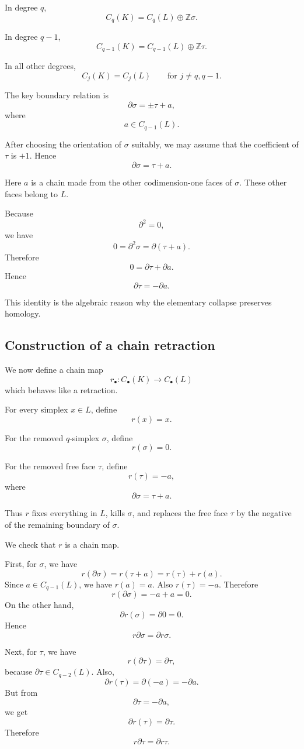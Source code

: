 \documentclass[12pt,a4paper]{article}
\theoremstyle{notespace}
\begin{document}
In degree \(q\),
\[
C_q(K)=C_q(L)\oplus \mathbb Z\sigma.
\]

In degree \(q-1\),
\[
C_{q-1}(K)=C_{q-1}(L)\oplus \mathbb Z\tau.
\]

In all other degrees,
\[
C_j(K)=C_j(L)
\qquad
\text{for } j\neq q,q-1.
\]

The key boundary relation is
\[
\partial \sigma=\pm \tau+a,
\]
where
\[
a\in C_{q-1}(L).
\]

After choosing the orientation of \(\sigma\) suitably, we may assume that the coefficient of \(\tau\) is \(+1\). Hence
\[
\partial \sigma=\tau+a.
\]

Here \(a\) is a chain made from the other codimension-one faces of \(\sigma\). These other faces belong to \(L\).

Because
\[
\partial^2=0,
\]
we have
\[
0=\partial^2\sigma=\partial(\tau+a).
\]
Therefore
\[
0=\partial\tau+\partial a.
\]
Hence
\[
\partial\tau=-\partial a.
\]

This identity is the algebraic reason why the elementary collapse preserves homology.

\subsection{Construction of a chain retraction}

We now define a chain map
\[
r_\bullet\colon C_\bullet(K)\to C_\bullet(L)
\]
which behaves like a retraction.

For every simplex \(x\in L\), define
\[
r(x)=x.
\]

For the removed \(q\)-simplex \(\sigma\), define
\[
r(\sigma)=0.
\]

For the removed free face \(\tau\), define
\[
r(\tau)=-a,
\]
where
\[
\partial\sigma=\tau+a.
\]

Thus \(r\) fixes everything in \(L\), kills \(\sigma\), and replaces the free face \(\tau\) by the negative of the remaining boundary of \(\sigma\).

We check that \(r\) is a chain map.

First, for \(\sigma\), we have
\[
r(\partial\sigma)
=
r(\tau+a)
=
r(\tau)+r(a).
\]
Since \(a\in C_{q-1}(L)\), we have \(r(a)=a\). Also \(r(\tau)=-a\). Therefore
\[
r(\partial\sigma)=-a+a=0.
\]
On the other hand,
\[
\partial r(\sigma)=\partial 0=0.
\]
Hence
\[
r\partial\sigma=\partial r\sigma.
\]

Next, for \(\tau\), we have
\[
r(\partial\tau)=\partial\tau,
\]
because \(\partial\tau\in C_{q-2}(L)\). Also,
\[
\partial r(\tau)
=
\partial(-a)
=
-\partial a.
\]
But from
\[
\partial\tau=-\partial a,
\]
we get
\[
\partial r(\tau)=\partial\tau.
\]
Therefore
\[
r\partial\tau=\partial r\tau.
\]
\end{document}
